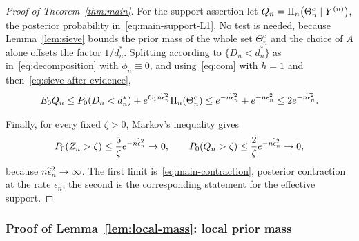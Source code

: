 \begin{proof}[Proof of Theorem~\ref{thm:main}]
For the support assertion let $Q_n=\Pi_n\!\left(\Theta_n^c\mid Y^{(n)}\right)$, the posterior probability in~\eqref{eq:main-support-L1}. No test is needed, because Lemma~\ref{lem:sieve} bounds the prior mass of the whole set $\Theta_n^c$ and the choice of $A$ alone offsets the factor $1/d_n^*$. Splitting according to $\{D_n<d_n^*\}$ as in~\eqref{eq:decomposition} with $\phi_n\equiv0$, and using~\eqref{eq:com} with $h=1$ and then~\eqref{eq:sieve-after-evidence},
\begin{align*}
E_0Q_n
\leq P_0(D_n<d_n^*)+e^{C_1n\widetilde{\epsilon}_n^2}\Pi_n(\Theta_n^c)
\leq e^{-n\widetilde{\epsilon}_n^2}+e^{-n\epsilon_n^2}
\leq2e^{-n\widetilde{\epsilon}_n^2}.
\end{align*}

Finally, for every fixed $\zeta>0$, Markov's inequality gives
\begin{align*}
P_0(Z_n>\zeta)\leq\frac5\zeta e^{-n\widetilde{\epsilon}_n^2}\to0,
\qquad
P_0(Q_n>\zeta)\leq\frac2\zeta e^{-n\widetilde{\epsilon}_n^2}\to0,
\end{align*}
because $n\widetilde{\epsilon}_n^2\to\infty$. The first limit is~\eqref{eq:main-contraction}, posterior contraction at the rate $\epsilon_n$; the second is the corresponding statement for the effective support.
\end{proof}

\subsubsection*{Proof of Lemma~\ref{lem:local-mass}: local prior mass}

